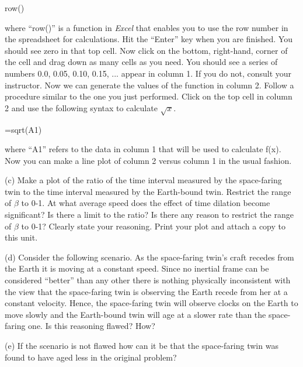 {row()\par}

where {}``row()'' is a function in \emph{Excel} that enables
you to use the row number in the spreadsheet for calculations. Hit
the {}``Enter'' key when you are finished. You should see zero in that
top cell. Now click on the bottom, right-hand, corner of the cell
and drag down as many cells as you need. You should see a series of
numbers 0.0, 0.05, 0.10, 0.15, ... appear in column 1. If you do
not, consult your instructor. Now we can generate the values of the
function in column 2. Follow a procedure similar to the one you just
performed. Click on the top cell in column 2 and use
the following syntax to calculate \( \sqrt{x} \).

{\centering =sqrt(A1)\par}

where {}``A1'' refers to the data in column 1 that will be used
to calculate f(x). Now you can make a line plot of column 2 versus
column 1 in the usual fashion.

(c) Make a plot of the ratio of the time interval measured by the
space-faring twin to the time interval measured by the Earth-bound
twin. Restrict the range of \( \beta  \) to 0-1. At what average
speed does the effect of time dilation become significant? Is there
a limit to the ratio? Is there any reason to restrict the range of
\( \beta  \) to 0-1? Clearly state your reasoning. Print your plot
and attach a copy to this unit.
\vspace{25mm}

(d) Consider the following scenario. As the space-faring twin's craft
recedes from the Earth it is moving at a constant speed. Since no
inertial frame can be considered {}``better'' than any other there
is nothing physically inconsistent with the view that the space-faring
twin is observing the Earth recede from her at a constant velocity.
Hence, the space-faring twin will observe clocks on the Earth to move
slowly and the Earth-bound twin will age at a slower rate than the
space-faring one. Is this reasoning flawed? How? 
\vspace{25mm}

(e) If the scenario is not flawed how can it be that the space-faring
twin was found to have aged less in the original problem?

